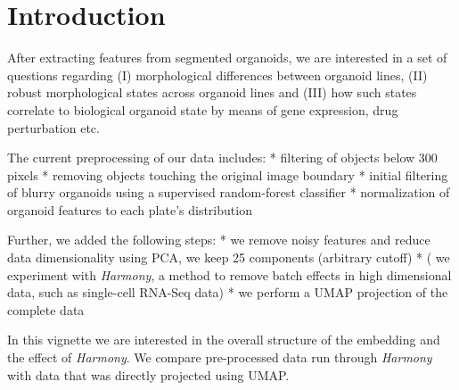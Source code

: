 \documentclass[
]{article}
\begin{document}
\hypertarget{introduction}{%
\section{Introduction}\label{introduction}}

After extracting features from segmented organoids, we are interested in
a set of questions regarding (I) morphological differences between
organoid lines, (II) robust morphological states across organoid lines
and (III) how such states correlate to biological organoid state by
means of gene expression, drug perturbation etc.

The current preprocessing of our data includes: * filtering of objects
below 300 pixels * removing objects touching the original image boundary
* initial filtering of blurry organoids using a supervised random-forest
classifier * normalization of organoid features to each plate's
distribution

Further, we added the following steps: * we remove noisy features and
reduce data dimensionality using PCA, we keep 25 components (arbitrary
cutoff) * ( we experiment with \emph{Harmony}, a method to remove batch
effects in high dimensional data, such as single-cell RNA-Seq data) * we
perform a UMAP projection of the complete data

In this vignette we are interested in the overall structure of the
embedding and the effect of \emph{Harmony}. We compare pre-processed
data run through \emph{Harmony} with data that was directly projected
using UMAP.
\end{document}
